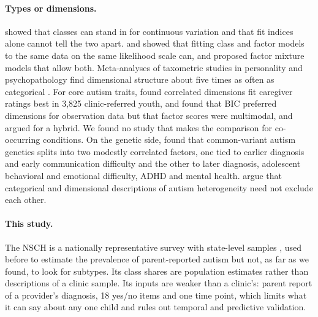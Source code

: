 \paragraph{Types or dimensions.}
\citet{bauer2003,bauer2004} showed that classes can stand in for continuous variation and that fit indices alone cannot tell the two apart. \citet{lubke2006} and \citet{markon2006} showed that fitting class and factor models to the same data on the same likelihood scale can, and \citet{lubke2005} proposed factor mixture models that allow both. Meta-analyses of taxometric studies in personality and psychopathology find dimensional structure about five times as often as categorical \citep{haslam2012,haslam2020}. For core autism traits, \citet{kim2019} found correlated dimensions fit caregiver ratings best in 3,825 clinic-referred youth, and \citet{wittkopf2023} found that BIC preferred dimensions for observation data but that factor scores were multimodal, and argued for a hybrid. We found no study that makes the comparison for co-occurring conditions. On the genetic side, \citet{zhang2025} found that common-variant autism genetics splits into two modestly correlated factors, one tied to earlier diagnosis and early communication difficulty and the other to later diagnosis, adolescent behavioral and emotional difficulty, ADHD and mental health. \citet{lombardo2019} argue that categorical and dimensional descriptions of autism heterogeneity need not exclude each other.

\paragraph{This study.}
The NSCH is a nationally representative survey with state-level samples \citep{ghandour2018}, used before to estimate the prevalence of parent-reported autism \citep{kogan2018} but not, as far as we found, to look for subtypes. Its class shares are population estimates rather than descriptions of a clinic sample. Its inputs are weaker than a clinic's: parent report of a provider's diagnosis, 18 yes/no items and one time point, which limits what it can say about any one child and rules out temporal and predictive validation.

